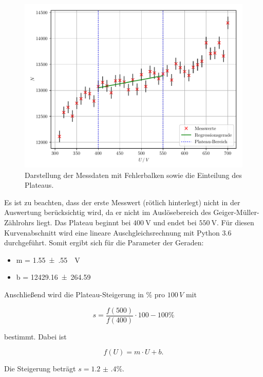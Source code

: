 \begin{figure}[H]
  \centering
  \includegraphics{plot1.pdf}
  \caption{Darstellung der Messdaten mit Fehlerbalken sowie die Einteilung des Plateaus.}
  \label{abb:6}
\end{figure}
Es ist zu beachten, dass der erste Messwert (rötlich hinterlegt) nicht in der Auswertung berücksichtig wird,
da er nicht im Auslösebereich des Geiger-Müller-Zählrohrs liegt.
Das Plateau beginnt bei $\SI{400}{\volt}$ und endet bei $\SI{550}{\volt}$.
Für diesen Kurvenabschnitt wird eine lineare Auschgleichsrechnung mit Python 3.6 durchgeführt.
Somit ergibt sich für die Parameter der Geraden:

\begin{itemize}
  \item m = \SI{1.55(55)}{\per\volt}
  \item b = \num{12429.16(26459)}
\end{itemize}

Anschließend wird die Plateau-Steigerung in $\%$ pro $100 \, V$ mit

\begin{equation*}
  s = \frac{f(500)}{f(400)} \cdot 100 - 100 \%
\end{equation*}

bestimmt. Dabei ist

\begin{equation*}
  f(U) = m \cdot U + b.
\end{equation*}

Die Steigerung beträgt $s = \num{1.2(4)} \%$.

